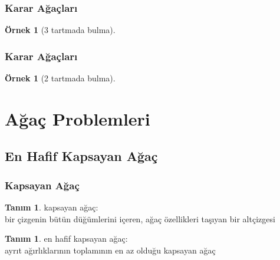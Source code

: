 \documentclass[dvipsnames]{beamer}
\theoremstyle{definition}
\newtheorem{tanim}[theorem]{Tanım}
\theoremstyle{example}
\newtheorem{ornek}[theorem]{Örnek}
\theoremstyle{plain}
\begin{document}
\begin{frame}
  \frametitle{Karar Ağaçları}

  \begin{ornek}[3 tartmada bulma]
    \begin{center}
    \end{center}
  \end{ornek}
\end{frame}

\begin{frame}
  \frametitle{Karar Ağaçları}

  \begin{ornek}[2 tartmada bulma]
    \begin{center}
    \end{center}
  \end{ornek}
\end{frame}

\section{Ağaç Problemleri}

\subsection{En Hafif Kapsayan Ağaç}

\begin{frame}
  \frametitle{Kapsayan Ağaç}

  \begin{tanim}
    \alert{kapsayan ağaç}:\\
    bir çizgenin bütün düğümlerini içeren, ağaç özellikleri taşıyan bir
    altçizgesi
  \end{tanim}

  \pause
  \begin{tanim}
    \alert{en hafif kapsayan ağaç}:\\
    ayrıt ağırlıklarının toplamının en az olduğu kapsayan ağaç
  \end{tanim}
\end{frame}
\end{document}
